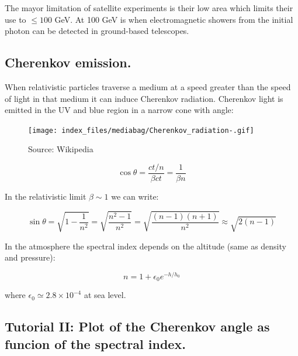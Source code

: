 \documentclass[
  letterpaper,
  DIV=11,
  numbers=noendperiod]{scrreprt}
\begin{document}
The mayor limitation of satellite experiments is their low area which
limits their use to \(\leq 100\) GeV. At 100 GeV is when electromagnetic
showers from the initial photon can be detected in ground-based
telescopes.

\subsection{Cherenkov emission.}\label{cherenkov-emission.}

When relativistic particles traverse a medium at a speed greater than
the speed of light in that medium it can induce Cherenkov radiation.
Cherenkov light is emitted in the UV and blue region in a narrow cone
with angle:

\begin{figure}[H]

{\centering \texttt{[image: index\_files/mediabag/Cherenkov\_radiation-.gif]}

}

\caption{Source: Wikipedia}

\end{figure}%

\[\cos \theta = \frac{ct/n}{\beta c t} = \frac{1}{\beta n}\]

In the relativistic limit \(\beta \sim 1\) we can write:

\[\sin \theta = \sqrt{1 - \frac{1}{n^2}} = \sqrt{\frac{n^2 - 1}{n^2}} = \sqrt{\frac{(n-1)(n+1)}{n^2}} \approx \sqrt{2(n-1)}\]

In the atmosphere the spectral index depends on the altitude (same as
density and pressure):

\[n = 1 + \epsilon_0 e^{-h/h_0} \]

where \(\epsilon_0 \simeq 2.8 \times 10^{-4}\) at sea level.

\subsection{Tutorial II: Plot of the Cherenkov angle as funcion of the
spectral
index.}\label{tutorial-ii-plot-of-the-cherenkov-angle-as-funcion-of-the-spectral-index.}
\end{document}
